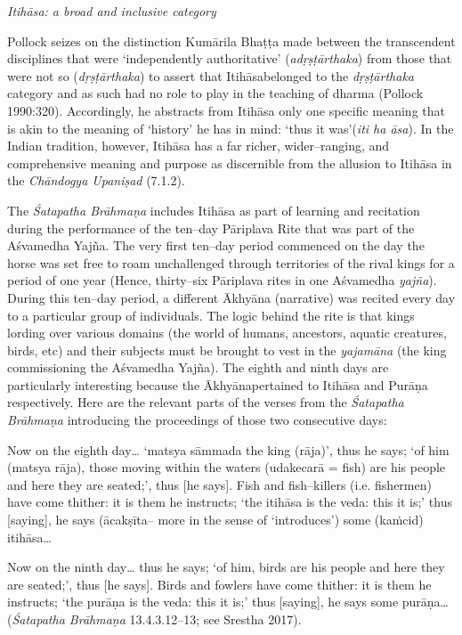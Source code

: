 \textit{Itihāsa: a broad and inclusive category}

Pollock seizes on the distinction Kumārila Bhaṭṭa made between the transcendent disciplines that were ‘independently authoritative’ (\textit{adṛṣṭārthaka}) from those that were not so (\textit{dṛṣṭārthaka}) to assert that Itihāsabelonged to the \textit{dṛṣṭārthaka} category and as such had no role to play in the teaching of dharma (Pollock 1990:320). Accordingly, he abstracts from Itihāsa only one specific meaning that is akin to the meaning of ‘history’ he has in mind: ‘thus it was’(\textit{iti ha āsa}). In the Indian tradition, however, Itihāsa has a far richer, wider–ranging, and comprehensive meaning and purpose as discernible from the allusion to Itihāsa in the \textit{Chāndogya Upaniṣad} (7.1.2). 

The \textit{Śatapatha Brāhmaṇa} includes Itihāsa as part of learning and recitation during the performance of the ten–day Pāriplava Rite that was part of the Aśvamedha Yajña. The very first ten–day period commenced on the day the horse was set free to roam unchallenged through territories of the rival kings for a period of one year (Hence, thirty–six Pāriplava rites in one Aśvamedha \textit{yajña}). During this ten–day period, a different Ākhyāna (narrative) was recited every day to a particular group of individuals. The logic behind the rite is that kings lording over various domains (the world of humans, ancestors, aquatic creatures, birds, etc) and their subjects must be brought to vest in the \textit{yajamāna} (the king commissioning the Aśvamedha Yajña). The eighth and ninth days are particularly interesting because the Ākhyānapertained to Itihāsa and Purāṇa respectively. Here are the relevant parts of the verses from the \textit{Śatapatha Brāhmaṇa} introducing the proceedings of those two consecutive days:

\begin{myquote}
Now on the eighth day… ‘matsya sāmmada the king (rāja)’, thus he says; ‘of him (matsya rāja), those moving within the waters (udakecarā = fish) are his people and here they are seated;’, thus [he says]. Fish and fish–killers (i.e. fishermen) have come thither: it is them he instructs; ‘the itihāsa is the veda: this it is;’ thus [saying], he says (ācakṣīta– more in the sense of ‘introduces’) some (kaṁcid) itihāsa…
\end{myquote}

\begin{myquote}
Now on the ninth day… thus he says; ‘of him, birds are his people and here they are seated;’, thus [he says]. Birds and fowlers have come thither: it is them he instructs; ‘the purāṇa is the veda: this it is;’ thus [saying], he says some purāṇa…(\textit{Śatapatha Brāhmaṇa} 13.4.3.12–13; see Srestha 2017).
\end{myquote}

